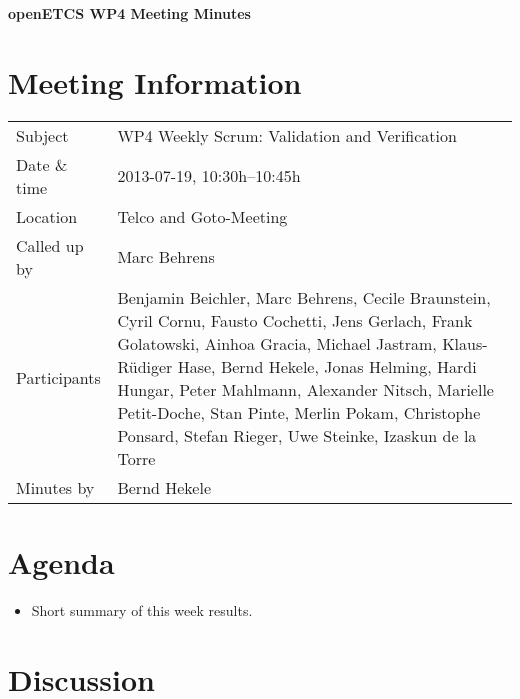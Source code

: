 \documentclass[a4paper, 11pt]{article}
\begin{document}
{\begin{center}\huge\bf openETCS WP4 Meeting Minutes\end{center}}
\section{Meeting Information}

\renewcommand{\arraystretch}{1.5}
\begin{supertabular}{m{.2\textwidth}m{.8\textwidth}}
Subject & WP4 Weekly Scrum: Validation and Verification\\
Date \& time & 2013-07-19, 10:30h--10:45h\\
Location & Telco and Goto-Meeting\\
Called up by & Marc Behrens\\
Participants &
Benjamin Beichler,
Marc Behrens,
Cecile Braunstein,
Cyril Cornu,
Fausto Cochetti,
Jens Gerlach,
Frank Golatowski,
Ainhoa Gracia,
Michael Jastram,
Klaus-R\"udiger Hase,
Bernd Hekele,
Jonas Helming,
Hardi Hungar,
Peter Mahlmann,
Alexander Nitsch,
Marielle Petit-Doche,
Stan Pinte,
Merlin Pokam,
Christophe Ponsard,
Stefan Rieger,
Uwe Steinke,
Izaskun de la Torre
\\

Minutes by & Bernd Hekele\\

\end{supertabular}
\renewcommand{\arraystretch}{1.0}


\section{{Agenda}}
\begin{itemize}
\item Short summary of this week results.
\end{itemize}

\section{Discussion}
\end{document}
